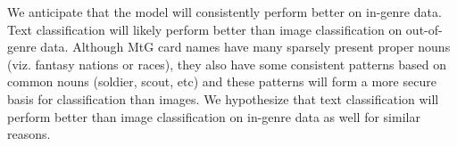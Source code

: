 \documentclass{article}
\begin{document}
We anticipate that the model will
consistently perform better on in-genre data.
Text classification
will likely perform better than image classification
on out-of-genre data.
Although MtG card names have many sparsely present proper nouns
(viz. fantasy nations or races),
they also have some consistent patterns based on common nouns
(soldier, scout, etc) and these patterns will form a more
secure basis for classification than images.
We hypothesize that text classification will perform
better than image classification on in-genre data as
well for similar reasons.


{}

\end{document}
